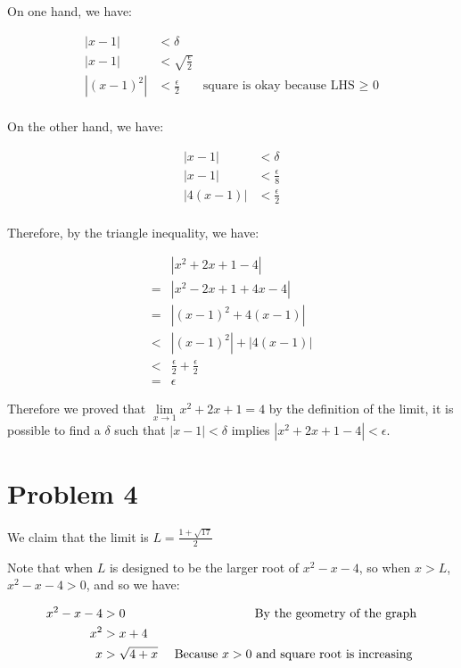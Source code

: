 \documentclass{article}
\begin{document}
On one hand, we have:

\begin{align*}
  |x - 1| &< \delta \\
  |x - 1| &< \sqrt{\frac{\epsilon}{2}} \\
  |(x-1)^2| &< \frac{\epsilon}{2} &\text{square is okay because LHS $\ge$ 0} \\
\end{align*}

On the other hand, we have:

\begin{align*}
  |x - 1| &< \delta \\
  |x - 1| &< \frac{\epsilon}{8} \\
  |4(x-1)| &< \frac{\epsilon}{2} \\
\end{align*}

Therefore, by the triangle inequality, we have:

\begin{align*}
   & |x^2 + 2x + 1 - 4 | \\
  =& |x^2 - 2x + 1 + 4x - 4| \\
  =& |(x-1)^2 + 4(x-1)| \\
  <& |(x-1)^2| + |4(x-1)| \\
  <& \frac{\epsilon}{2} + \frac{\epsilon}{2} \\
  =& \epsilon
\end{align*}

Therefore we proved that $ \lim\limits_{x \to 1} x^2 + 2x + 1 = 4 $ by the definition of the limit, it is possible to find a $ \delta $ such that $ |x - 1| < \delta $ implies $ |x^2 + 2x + 1 - 4| < \epsilon $.

\section*{Problem 4}

We claim that the limit is $ L = \frac{1 + \sqrt{17}}{2} $

Note that when $ L $ is designed to be the larger root of $ x^2 - x - 4 $, so when $ x > L $, $ x^2 - x - 4 > 0 $, and so we have:

\begin{align*}
  x^2 - x - 4 &> 0 & \text{ By the geometry of the graph} \\
  x^2 &> x + 4 \\
  x &> \sqrt{4 + x} & \text{ Because $ x > 0 $ and square root is increasing } \\
\end{align*}
\end{document}
